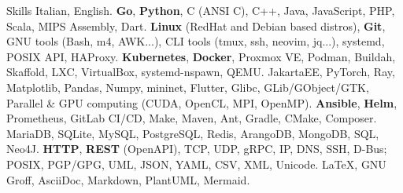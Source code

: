 \begin{rubric}{Skills}
	\entry*[Languages] Italian, English.
	\entry*[Coding] \textbf{Go}, \textbf{Python}, C (ANSI C), C++, Java, JavaScript, PHP, Scala, MIPS Assembly, Dart.
	 \textbf{Linux} (RedHat and Debian based distros), \textbf{Git}, GNU tools (Bash, m4, AWK...), CLI tools (tmux, ssh, neovim, jq...), systemd, POSIX API, HAProxy.
	\entry*[Virtualization] \textbf{Kubernetes}, \textbf{Docker}, Proxmox VE, Podman, Buildah, Skaffold, LXC, VirtualBox, systemd-nspawn, QEMU.
	\entry*[Frameworks] JakartaEE, PyTorch, Ray, Matplotlib, Pandas, Numpy, mininet, Flutter, Glibc, GLib/GObject/GTK, Parallel \& GPU computing (CUDA, OpenCL, MPI, OpenMP).
	 \textbf{Ansible}, \textbf{Helm}, Prometheus, GitLab CI/CD, Make, Maven, Ant, Gradle, CMake, Composer.
	\entry*[Databases] MariaDB, SQLite, MySQL, PostgreSQL, Redis, ArangoDB, MongoDB, SQL, Neo4J.
	 \textbf{HTTP}, \textbf{REST} (OpenAPI), TCP, UDP, gRPC, IP, DNS, SSH, D-Bus; POSIX, PGP/GPG, UML, JSON, YAML, CSV, XML, Unicode.
	\entry*[Writing] \LaTeX, GNU Groff, AsciiDoc, Markdown, PlantUML, Mermaid.
\end{rubric}